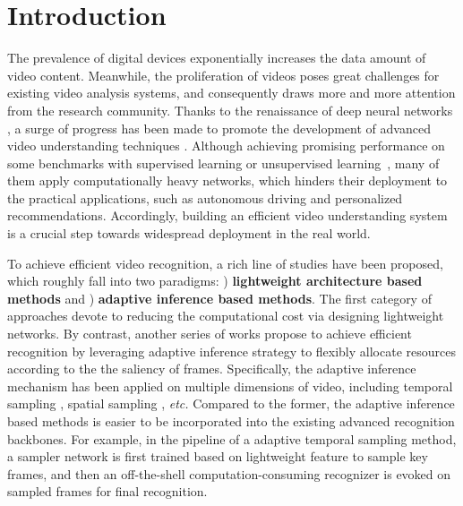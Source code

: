 \documentclass[runningheads]{llncs}
\begin{document}
\section{Introduction}
\label{intro}
The prevalence of digital devices exponentially increases the data amount of video content. Meanwhile, the proliferation of videos poses great challenges for existing video analysis systems, and consequently draws more and more attention from the research community. 
Thanks to the renaissance of deep neural networks \cite{resnet,haoran_ijcai,gfnet}, a surge of progress has been made to promote the development of advanced video understanding techniques \cite{surui_2019_CVPR,surui_2021_ICCV,bcnet,wu2021weakly,AKnet,wang2020symbiotic,liu2019multi,huang2018toward}. 
Although achieving promising performance on some benchmarks \cite{kay2017kinetics,caba2015activitynet} with supervised learning or unsupervised learning~\cite{ASCNet,mamico}, many of them apply computationally heavy networks, which hinders their deployment to the practical applications, such as autonomous driving and personalized recommendations. Accordingly, building an efficient video understanding system is a crucial step towards widespread deployment in the real world.  






To achieve efficient video recognition,
a rich line of studies have been proposed, which roughly fall into two paradigms: ) 
\textbf{lightweight architecture based methods} and ) \textbf{adaptive inference based methods}. The first category of approaches \cite{tsm,mvf} devote to reducing the computational cost via designing lightweight networks. By contrast, another series of works propose to achieve efficient recognition by leveraging adaptive inference strategy to flexibly allocate resources according to the the saliency of frames. Specifically, the adaptive inference mechanism has been applied on multiple dimensions of video, including temporal sampling \cite{scsampler19}, spatial sampling \cite{adafocus,arnet}, \emph{etc.} Compared to the former, the adaptive inference based methods is easier to be incorporated into the existing advanced recognition backbones. For example, in the pipeline of a adaptive temporal sampling method, a sampler network is first trained based on lightweight feature to sample key frames, and then an off-the-shell computation-consuming recognizer is evoked on sampled frames for final recognition. 
\end{document}
